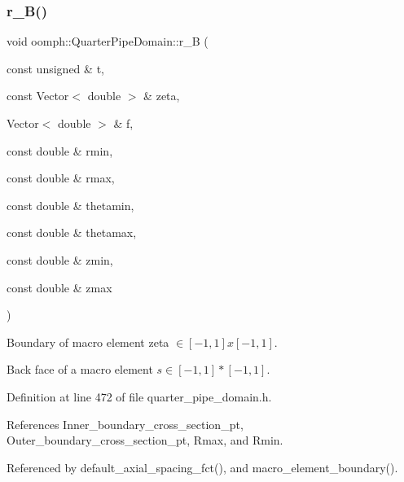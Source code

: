 \subsubsection{\texorpdfstring{r\+\_\+\+B()}{r\_B()}}
{\footnotesize\ttfamily void oomph\+::\+Quarter\+Pipe\+Domain\+::r\+\_\+B (\begin{DoxyParamCaption}\item[{const unsigned \&}]{t,  }\item[{const Vector$<$ double $>$ \&}]{zeta,  }\item[{Vector$<$ double $>$ \&}]{f,  }\item[{const double \&}]{rmin,  }\item[{const double \&}]{rmax,  }\item[{const double \&}]{thetamin,  }\item[{const double \&}]{thetamax,  }\item[{const double \&}]{zmin,  }\item[{const double \&}]{zmax }\end{DoxyParamCaption})\hspace{0.3cm}{\ttfamily [private]}}



Boundary of macro element zeta $ \in [-1,1]x[-1,1] $. 

Back face of a macro element $ s \in [-1,1]*[-1,1] $. 

Definition at line 472 of file quarter\+\_\+pipe\+\_\+domain.\+h.



References Inner\+\_\+boundary\+\_\+cross\+\_\+section\+\_\+pt, Outer\+\_\+boundary\+\_\+cross\+\_\+section\+\_\+pt, Rmax, and Rmin.



Referenced by default\+\_\+axial\+\_\+spacing\+\_\+fct(), and macro\+\_\+element\+\_\+boundary().

\mbox{\label{classoomph_1_1QuarterPipeDomain_aeb6e4d3fbb8afb4ad2597601f1a46afd}} 
